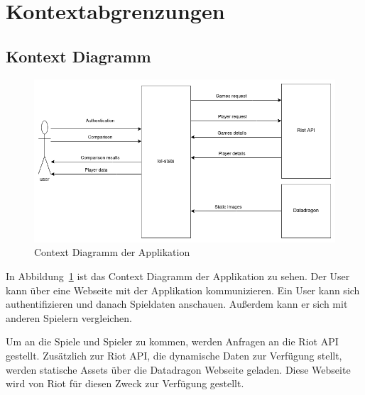 \section{Kontextabgrenzungen}
\subsection{Kontext Diagramm}

\begin{figure}[H]
    \centering
    \includegraphics[width=\textwidth]{images/03-context-diagram}
    \caption{Context Diagramm der Applikation}
    \label{fig:context-diagram}
\end{figure}

In Abbildung~\ref{fig:context-diagram} ist das Context Diagramm der Applikation zu sehen.
Der User kann über eine Webseite mit der Applikation kommunizieren.
Ein User kann sich authentifizieren und danach Spieldaten anschauen.
Außerdem kann er sich mit anderen Spielern vergleichen.

Um an die Spiele und Spieler zu kommen, werden Anfragen an die Riot API gestellt.
Zusätzlich zur Riot API, die dynamische Daten zur Verfügung stellt, werden statische Assets über die Datadragon
Webseite geladen.
Diese Webseite wird von Riot für diesen Zweck zur Verfügung gestellt.

